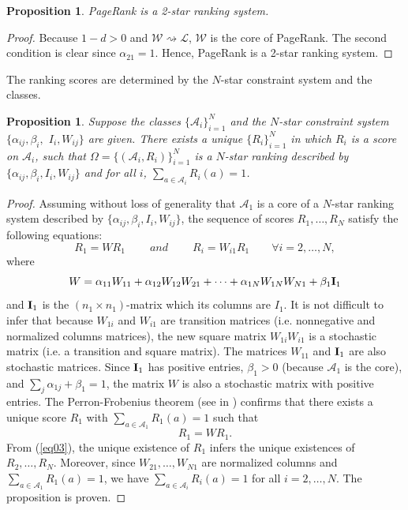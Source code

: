 \documentclass[10pt,leqno,twoside]{article}
\newtheorem{proposition}[theorem]{\indent Proposition}
\begin{document}
\begin{proposition}
PageRank is a 2-star ranking system.
\end{proposition}
\begin{proof}
Because $1-d > 0$ and $\mathcal{W} \rightsquigarrow \mathcal{L}$, $\mathcal{W}$ is the core of PageRank. The second condition is clear since $\alpha_{21} = 1$. Hence, PageRank is a 2-star ranking system.
\end{proof}
The  ranking scores  are determined by  the $N$-star constraint system and the classes.
\begin{proposition}
Suppose the classes $\{\mathcal{A}_i\}^N_{i=1}$ and the $N$-star constraint system $\{\alpha_{ij}, \beta_{i},$ $I_i, W_{ij}\}$  are given. There exists a unique $\{R_i\}^N_{i=1}$ in which $R_i$ is a score on $\mathcal{A}_i$, such that $\Omega = \{(\mathcal{A}_i,R_i)\}^N_{i=1}$ is a $N$-star ranking described by $\{\alpha_{ij},\beta_{i},I_i,W_{ij}\}$ and for all $i$, $\sum_{a\in \mathcal{A}_i }R_i(a)=1$.
\end{proposition}
\begin{proof}
Assuming without loss of generality that $\mathcal{A}_1$ is a core of a $N$-star ranking system described by $\{\alpha_{ij},\beta_{i},I_i,W_{ij}\}$, the sequence of scores $R_1,\ldots,R_N$ satisfy the following equations:
\begin{equation}\label{eq03}
R_1 = WR_1 \qquad ~and~ \qquad
R_i = W_{i1}R_1 \qquad \forall i = 2,\ldots,N,
\end{equation}
where
\begin{equation}\label{eq39}
W = \alpha_{11}W_{11} + \alpha_{12}W_{12}W_{21} + \cdots + \alpha_{1N}W_{1N}W_{N1} + \beta_{1}{\bf I}_1
\end{equation}
and ${\bf I}_1$ is the $(n_1\times n_1)$-matrix which its columns are $I_1$. It is not difficult to infer that because $W_{1i}$ and $W_{i1}$ are transition matrices (i.e. nonnegative and normalized columns matrices), the new square matrix $W_{1i}W_{i1}$ is a stochastic matrix (i.e. a transition and square matrix). The matrices $W_{11}$ and ${\bf I}_1$ are also stochastic matrices. Since ${\bf I}_1$ has positive entries, $\beta_1 > 0$ (because $\mathcal{A}_1$ is the core), and $\sum_j\alpha_{1j} + \beta_1 = 1$, the matrix $W$ is also a stochastic matrix with positive entries. The Perron-Frobenius theorem (see in \cite{Keener1993,Kien09}) confirms that there exists a unique score $R_1$ with $\sum_{a\in\mathcal{A}_1}R_1(a) = 1$ such that
\[R_1 = WR_1.\]
From (\ref{eq03}), the unique existence of $R_1$ infers the unique existences of $R_2,\ldots,R_N$. Moreover, since $W_{21}, \ldots,W_{N1}$ are normalized columns and $\sum_{a\in\mathcal{A}_1}R_1(a) = 1$, we have $\sum_{a\in\mathcal{A}_i}R_i(a) = 1$ for all $i = 2,\ldots,N$. The proposition is proven.
\end{proof}
\end{document}
